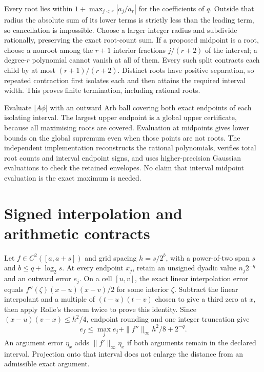 \documentclass[11pt]{article}
\begin{document}
Every root lies within
$1+\max_{j<r}|a_j/a_r|$ for the coefficients of $q$.
Outside that radius the absolute sum of its lower terms is strictly less
than the leading term, so cancellation is impossible.
Choose a larger integer radius and subdivide rationally, preserving the
exact root-count sum.  If a proposed midpoint is a root, choose a nonroot
among the $r+1$ interior fractions $j/(r+2)$ of the interval; a degree-$r$
polynomial cannot vanish at all of them.  Every such split contracts each
child by at most $(r+1)/(r+2)$.  Distinct roots have positive separation,
so repeated contraction first isolates each and then attains the required
interval width.  This proves finite termination, including rational roots.

Evaluate $|A\phi|$ with an outward Arb ball covering both exact endpoints
of each isolating interval.  The largest upper endpoint is a global upper
certificate, because all maximising roots are covered.  Evaluation at
midpoints gives lower bounds on the global supremum even when those points
are not roots.  The independent implementation reconstructs the rational
polynomials, verifies total root counts and interval endpoint signs, and
uses higher-precision Gaussian evaluations to check the retained envelopes.
No claim that interval midpoint evaluation is the exact maximum is needed.

\section{Signed interpolation and arithmetic contracts}
\label{app:arithmetic}

Let $f\in C^2([a,a+s])$ and grid spacing $h=s/2^b$, with a power-of-two
span $s$ and $b\leq q+\log_2s$.  At every endpoint $x_j$, retain an
unsigned dyadic value $n_j2^{-q}$ and an outward error $e_j$.
On a cell $[u,v]$, the exact linear interpolation error equals
$f''(\zeta)(x-u)(x-v)/2$ for some interior $\zeta$.
Subtract the linear interpolant and a multiple of $(t-u)(t-v)$ chosen to
give a third zero at $x$, then apply Rolle's theorem twice to prove this
identity.  Since $(x-u)(v-x)\leq h^2/4$, endpoint rounding and one integer
truncation give
\begin{equation}
 e_f\leq\max_je_j+\|f''\|_\infty h^2/8+2^{-q}.
 \label{eq:appendix-interpolation}
\end{equation}
An argument error $\eta_x$ adds $\|f'\|_\infty\eta_x$ if both arguments
remain in the declared interval.  Projection onto that interval does not
enlarge the distance from an admissible exact argument.
\end{document}
